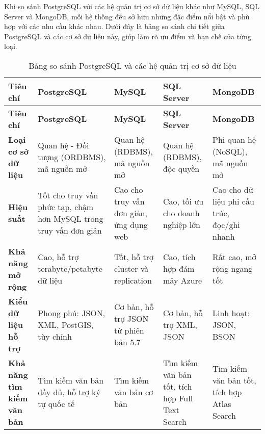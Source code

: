 \begin{enumerate}[(a)]
	      Khi so sánh PostgreSQL với các hệ quản trị cơ sở dữ liệu khác như MySQL, SQL Server và MongoDB, mỗi hệ thống đều sở hữu những đặc điểm nổi bật và phù hợp với các nhu cầu khác nhau. Dưới đây là bảng so sánh chi tiết giữa PostgreSQL và các cơ sở dữ liệu này, giúp làm rõ ưu điểm và hạn chế của từng loại.

	      \begin{landscape}
		      \begin{longtable}{|p{3.5cm}|p{4cm}|p{4cm}|p{4cm}|p{4cm}|}
			      \caption{Bảng so sánh PostgreSQL và các hệ quản trị cơ sở dữ liệu}
			      \hline
			      \textbf{Tiêu chí}                  & \textbf{PostgreSQL}                                               & \textbf{MySQL}                          & \textbf{SQL Server}                             & \textbf{MongoDB}                            \\
			      \hline
			      \endfirsthead
			      \hline
			      \textbf{Tiêu chí}                  & \textbf{PostgreSQL}                                               & \textbf{MySQL}                          & \textbf{SQL Server}                             & \textbf{MongoDB}                            \\
			      \hline
			      \endhead
			      \hline
			      \textbf{Loại cơ sở dữ liệu}        & Quan hệ - Đối tượng (ORDBMS), mã nguồn mở                         & Quan hệ (RDBMS), mã nguồn mở            & Quan hệ (RDBMS), độc quyền                      & Phi quan hệ (NoSQL), mã nguồn mở            \\
			      \hline
			      \textbf{Hiệu suất}                 & Tốt cho truy vấn phức tạp, chậm hơn MySQL trong truy vấn đơn giản & Cao cho truy vấn đơn giản, ứng dụng web & Cao, tối ưu cho doanh nghiệp lớn                & Cao cho dữ liệu phi cấu trúc, đọc/ghi nhanh \\
			      \hline
			      \textbf{Khả năng mở rộng}          & Cao, hỗ trợ terabyte/petabyte dữ liệu                             & Tốt, hỗ trợ cluster và replication      & Cao, tích hợp đám mây Azure                     & Rất cao, mở rộng ngang tốt                  \\
			      \hline
			      \textbf{Kiểu dữ liệu hỗ trợ}       & Phong phú: JSON, XML, PostGIS, tùy chỉnh                          & Cơ bản, hỗ trợ JSON từ phiên bản 5.7    & Cơ bản, hỗ trợ XML, JSON                        & Linh hoạt: JSON, BSON                       \\
			      \hline
			      \textbf{Khả năng tìm kiếm văn bản} & Tìm kiếm văn bản đầy đủ, hỗ trợ ký tự quốc tế                     & Tìm kiếm văn bản cơ bản                 & Tìm kiếm văn bản tốt, tích hợp Full Text Search & Tìm kiếm văn bản tốt, tích hợp Atlas Search \\

\end{longtable}
\end{landscape}
\end{enumerate}
